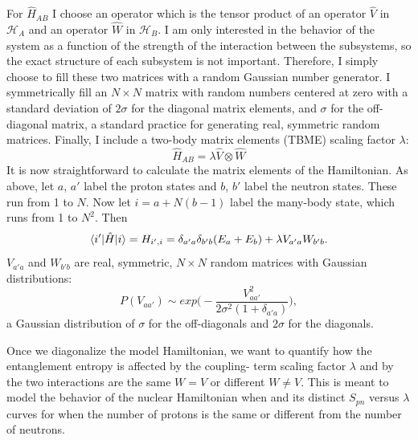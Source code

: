 For $\hat{H}_{AB}$ I choose an operator which is the tensor product of an 
operator $\hat{V}$ in $\mathcal{H}_A$ and an operator $\hat{W}$ in $\mathcal{H}_B$. I am only interested in
the behavior of the system as a function of the strength of the interaction between
the subsystems, so the exact structure of each subsystem is not important. Therefore, 
I simply choose to fill these two matrices with a random Gaussian number generator. I 
symmetrically fill an $N\times N$ matrix with random numbers centered at zero with a
standard deviation of $2\sigma$ for the diagonal matrix elements, 
and $\sigma$ for the off-diagonal matrix, a standard practice for generating 
real, symmetric random matrices. Finally, I include a two-body matrix elements 
(TBME) scaling factor $\lambda$:
\begin{equation}
	\hat{H}_{AB} = \lambda\hat{V}\otimes \hat{W}
\end{equation}
It is now straightforward to calculate the matrix elements of the Hamiltonian.
As above, let $a$, $a'$ label the proton states and $b$, $b'$ 
label the neutron states. These run from 1 to $N$. Now let $i = a + N(b-1)$ label 
the many-body state, which runs from 1 to $N^2$. Then
\begin{equation}\label{eq:1}
	\langle i'|\hat{H}|i\rangle =     
	H_{i',i} = \delta_{a'a}\delta_{b'b}(E_a+E_b)+\lambda V_{a'a} W_{b'b}.
\end{equation}
$V_{a'a}$ and $W_{b'b}$ are real, symmetric, $N \times N$ 
random matrices with Gaussian distributions:
\begin{equation}
    P(V_{aa'}) \sim exp\Big(-\frac{V_{aa'}^2}{2\sigma^2(1+\delta_{a'a})}\Big),
\end{equation}
a Gaussian distribution of $\sigma$ for the off-diagonals and $2\sigma$ for the diagonals.

Once we diagonalize the model Hamiltonian, we want to quantify
how the entanglement entropy is affected by the coupling-
term scaling factor $\lambda$ and by the two interactions
are the same $W=V$ or different $W\neq V$. This is meant to
model the behavior of the nuclear Hamiltonian when and its
distinct $S_{pn}$ versus $\lambda$ curves for when
the number of protons is the same or different from 
the number of neutrons. 

